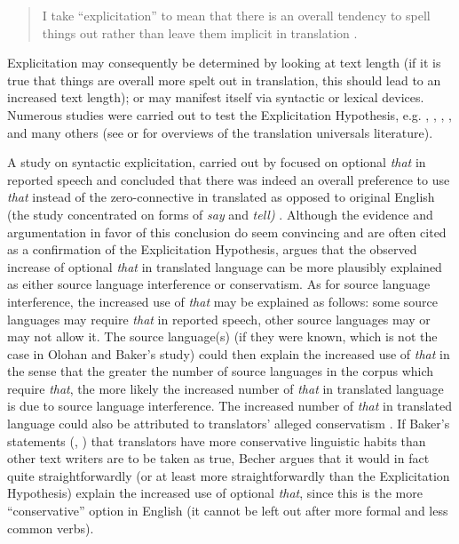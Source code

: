\begin{quote}
I take “explicitation” to mean that there is an overall tendency to spell things out rather than leave them implicit in translation \citep[180]{baker_corpus-based_1996}.
\end{quote}

Explicitation may consequently be determined by looking at text length (if it is true that things are overall more spelt out in translation, this should lead to an increased text length); or may manifest itself via syntactic or lexical devices. Numerous studies were carried out to test the Explicitation Hypothesis, e.g. \citet{overas_search_1998}, \citet{olohan_reporting_2000}, \citet{olohan_how_2003}, \citet{mutesayire_apposition_2004}, \citet{mauranen_explicitation_2004} and many others (see \citealt{Kruger2012} or \citealt{zanettin_corpus_2013} for overviews of the translation universals literature).

A study on syntactic explicitation, carried out by \citet{olohan_reporting_2000} focused on optional \textit{that} in reported speech and concluded that there was indeed an overall preference to use \textit{that} instead of the zero-connective in translated as opposed to original English (the study concentrated on forms of \textit{say} and \textit{tell)} \citep[157]{olohan_reporting_2000}. Although the evidence and argumentation in favor of this conclusion do seem convincing and are often cited as a confirmation of the Explicitation Hypothesis, \citet[10--11]{becher_abandoning_2010} argues that the observed increase of optional \textit{that} in translated language can be more plausibly explained as either source language interference or conservatism. As for source language interference, the increased use of \textit{that} may be explained as follows: some source languages may require \textit{that} in reported speech, other source languages may or may not allow it. The source language(s) (if they were known, which is not the case in Olohan and Baker’s study) could then explain the increased use of \textit{that} in the sense that the greater the number of source languages in the corpus which require \textit{that}, the more likely the increased number of \textit{that} in translated language is due to source language interference. The increased number of \textit{that} in translated language could also be attributed to translators’ alleged conservatism \citep{becher_abandoning_2010}. If Baker’s statements (\citealt[244]{baker_corpus_1993}, \citealt[183]{baker_corpus-based_1996}) that translators have more conservative linguistic habits than other text writers are to be taken as true, Becher argues that it would in fact quite straightforwardly (or at least more straightforwardly than the Explicitation Hypothesis) explain the increased use of optional \textit{that}, since this is the more ``conservative'' option in English (it cannot be left out after more formal and less common verbs).

